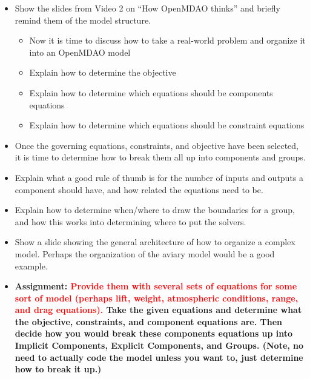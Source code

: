 \documentclass[12pt, letterpaper]{article}
\begin{document}
\begin{itemize}
\begin{itemize}
			\item Show the slides from Video 2 on “How OpenMDAO thinks” and briefly remind them of the model structure.
				\begin{itemize}
					\item Now it is time to discuss how to take a real-world problem and organize it into an OpenMDAO model
					\item Explain how to determine the objective
					\item Explain how to determine which equations should be components equations
					\item Explain how to determine which equations should be constraint equations
				\end{itemize}
			\item Once the governing equations, constraints, and objective have been selected, it is time to determine how to break them all up into components and groups.
			\item Explain what a good rule of thumb is for the number of inputs and outputs a component should have, and how related the equations need to be.
			\item Explain how to determine when/where to draw the boundaries for a group, and how this works into determining where to put the solvers.
			\item Show a slide showing the general architecture of how to organize a complex model. Perhaps the organization of the aviary model would be a good example.
			\item \textbf{Assignment: \textcolor{red}{Provide them with several sets of equations for some sort of model (perhaps lift, weight, atmospheric conditions, range, and drag equations).} Take the given equations and determine what the objective, constraints, and component equations are. Then decide how you would break these components equations up into Implicit Components, Explicit Components, and Groups. (Note, no need to actually code the model unless you want to, just determine how to break it up.)}

		\end{itemize}



\end{itemize}
\end{document}
